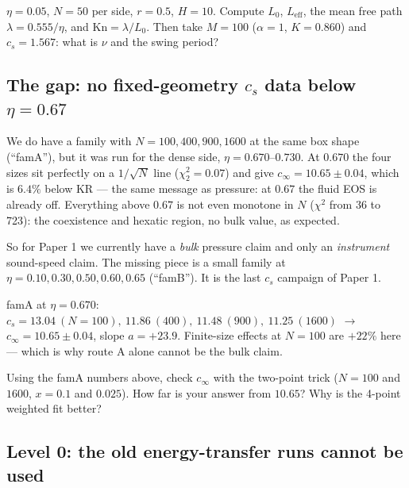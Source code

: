 \documentclass[11pt,a4paper]{article}
\begin{document}
\begin{ex}[Exercise 2]
$\eta = 0.05$, $N = 50$ per side, $r = 0.5$, $H = 10$. Compute $L_0$, $L_{\mathrm{eff}}$, the mean free path $\lambda = 0.555/\eta$, and $\mathrm{Kn} = \lambda/L_0$. Then take $M = 100$ ($\alpha = 1$, $K = 0.860$) and $c_s = 1.567$: what is $\nu$ and the swing period?
\end{ex}

\subsection{The gap: no fixed-geometry $c_s$ data below $\eta = 0.67$}

\begin{eli}
We do have a family with $N = 100, 400, 900, 1600$ at the same box shape (``famA''), but it was run for the dense side, $\eta = 0.670$--$0.730$. At $0.670$ the four sizes sit perfectly on a $1/\sqrt N$ line ($\chi^2_2 = 0.07$) and give $c_\infty = 10.65\pm0.04$, which is $6.4\%$ below KR --- the same message as pressure: at $0.67$ the fluid EOS is already off. Everything above $0.67$ is not even monotone in $N$ ($\chi^2$ from 36 to 723): the coexistence and hexatic region, no bulk value, as expected.

So for Paper 1 we currently have a \emph{bulk} pressure claim and only an \emph{instrument} sound-speed claim. The missing piece is a small family at $\eta = 0.10, 0.30, 0.50, 0.60, 0.65$ (``famB''). It is the last $c_s$ campaign of Paper 1.
\end{eli}

\begin{num}
famA at $\eta = 0.670$: $c_s = 13.04\ (N{=}100),\ 11.86\ (400),\ 11.48\ (900),\ 11.25\ (1600)$ $\to$ $c_\infty = 10.65\pm0.04$, slope $a = +23.9$. Finite-size effects at $N = 100$ are $+22\%$ here --- which is why route A alone cannot be the bulk claim.
\end{num}

\begin{ex}[Exercise 3]
Using the famA numbers above, check $c_\infty$ with the two-point trick ($N = 100$ and $1600$, $x = 0.1$ and $0.025$). How far is your answer from $10.65$? Why is the 4-point weighted fit better?
\end{ex}

\subsection{Level 0: the old energy-transfer runs cannot be used}
\end{document}

